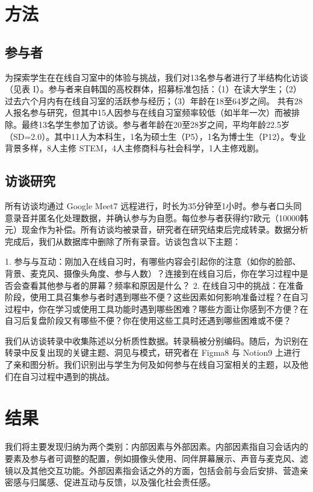 \documentclass[12pt]{ctexart}
\begin{document}
\section{方法}
\subsection{参与者}
为探索学生在在线自习室中的体验与挑战，我们对13名参与者进行了半结构化访谈（见表 I）。参与者来自韩国的高校群体，招募标准包括：（1）在读大学生；（2）过去六个月内有在线自习室的活跃参与经历；（3）年龄在18至64岁之间。
共有28人报名参与研究，但其中15人因参与在线自习室频率较低（如半年一次）而被排除。最终13名学生参加了访谈。参与者年龄在20至28岁之间，平均年龄22.5岁（SD=2.0）。其中11人为本科生，1名为硕士生（P5），1名为博士生（P12）。专业背景多样，8人主修 STEM，4人主修商科与社会科学，1人主修戏剧。

\subsection{访谈研究}
所有访谈均通过 Google Meet7 远程进行，时长为35分钟至1小时。参与者口头同意录音并匿名化处理数据，并确认参与为自愿。每位参与者获得约7欧元（10000韩元）现金作为补偿。所有访谈均被录音，研究者在研究结束后完成转录。数据分析完成后，我们从数据库中删除了所有录音。访谈包含以下主题：

1. 参与与互动：刚加入在线自习时，有哪些内容会引起你的注意（如你的脸部、背景、麦克风、摄像头角度、参与人数）？连接到在线自习后，你在学习过程中是否会查看其他参与者的屏幕？频率和原因是什么？
2. 在线自习中的挑战：在准备阶段，使用工具召集参与者时遇到哪些不便？这些因素如何影响准备过程？在自习过程中，你在学习或使用工具功能时遇到哪些困难？哪些方面让你感到不方便？在自习后复盘阶段又有哪些不便？你在使用这些工具时还遇到哪些困难或不便？

我们从访谈转录中收集陈述以分析质性数据。转录稿被分别编码。随后，为识别在转录中反复出现的关键主题、洞见与模式，研究者在 Figma8 与 Notion9 上进行了亲和图分析。我们识别出与学生为何及如何参与在线自习室相关的主题，以及他们在自习过程中遇到的挑战。

\section{结果}
我们将主要发现归纳为两个类别：内部因素与外部因素。内部因素指自习会话内的要素及参与者可调整的配置，例如摄像头使用、同伴屏幕展示、声音与麦克风、滤镜以及其他交互功能。外部因素指会话之外的方面，包括会前与会后安排、营造亲密感与归属感、促进互动与反馈，以及强化社会责任感。
\end{document}
